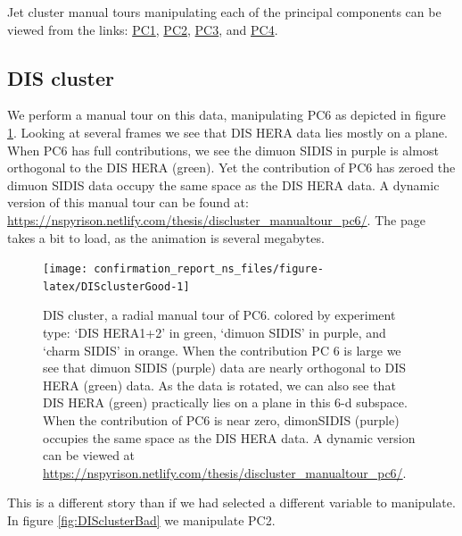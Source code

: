 \documentclass{monashthesis}
\begin{document}
Jet cluster manual tours manipulating each of the principal components
can be viewed from the links:
\href{https://nspyrison.netlify.com/thesis/jetcluster_manualtour_pc1/}{PC1},
\href{https://nspyrison.netlify.com/thesis/jetcluster_manualtour_pc2/}{PC2},
\href{https://nspyrison.netlify.com/thesis/jetcluster_manualtour_pc3/}{PC3},
and
\href{https://nspyrison.netlify.com/thesis/jetcluster_manualtour_pc4/}{PC4}.

\subsection{DIS cluster}\label{dis-cluster}

We perform a manual tour on this data, manipulating PC6 as depicted in
figure \ref{fig:DISclusterGood}. Looking at several frames we see that
DIS HERA data lies mostly on a plane. When PC6 has full contributions,
we see the dimuon SIDIS in purple is almost orthogonal to the DIS HERA
(green). Yet the contribution of PC6 has zeroed the dimuon SIDIS data
occupy the same space as the DIS HERA data. A dynamic version of this
manual tour can be found at:
\url{https://nspyrison.netlify.com/thesis/discluster_manualtour_pc6/}.
The page takes a bit to load, as the animation is several megabytes.











\begin{figure}

{\centering \texttt{[image: confirmation\_report\_ns\_files/figure-latex/DISclusterGood-1]} 

}

\caption{DIS cluster, a radial manual tour of PC6.
colored by experiment type: `DIS HERA1+2' in green, `dimuon SIDIS' in
purple, and `charm SIDIS' in orange. When the contribution PC 6 is large
we see that dimuon SIDIS (purple) data are nearly orthogonal to DIS HERA
(green) data. As the data is rotated, we can also see that DIS HERA
(green) practically lies on a plane in this 6-d subspace. When the
contribution of PC6 is near zero, dimonSIDIS (purple) occupies the same
space as the DIS HERA data. A dynamic version can be viewed at
\url{https://nspyrison.netlify.com/thesis/discluster_manualtour_pc6/}.}\label{fig:DISclusterGood}
\end{figure}

This is a different story than if we had selected a different variable
to manipulate. In figure \ref{fig:DISclusterBad} we manipulate PC2.
\end{document}
